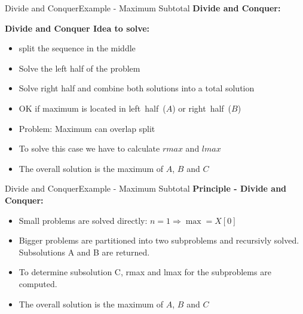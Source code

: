 \begin{frame}{Divide and Conquer}{Example - Maximum Subtotal}
  \textbf{Divide and Conquer:}
  \vspace{-1.5em}
  \begin{figure}
    \begin{adjustbox}{width=\linewidth}
      
    \end{adjustbox}
    \label{fig:divide_and_conquer:max_sub_total_divide}
  \end{figure}
   \vspace{-1.5em}
\textbf{Divide and Conquer Idea to solve:}
  \begin{itemize}
  \item split the sequence in the middle 
  \item<2->
    Solve the left half of the problem
  \item<3->
    Solve right half and combine both solutions into a total solution
  \item<4->
    OK if maximum is located in {\color{Mittel-Blau}left~half~($A$)}
    or {\color{Mittel-Blau}right~half~($B$)}
  \item<5->
    Problem: Maximum can {\color{Mittel-Blau} overlap split }
  \item<6->
    To solve this case we have to calculate $rmax$ and $lmax$
  \item<7->
    The overall solution is the {\color{Mittel-Blau}maximum of $A$, $B$ and $C$}
  \end{itemize}
\end{frame}


\begin{frame}{Divide and Conquer}{Example - Maximum Subtotal}
  \textbf{Principle - Divide and Conquer:}
  \begin{itemize}
    \item<2->
      Small problems are solved directly: {\color{Mittel-Blau}$n = 1 \Rightarrow \max = X[0]$}
    \item<3->
      Bigger problems are partitioned into two subproblems and recursivly solved. Subsolutions A and B
      are returned.
    \item<4>
      To determine subsolution C, rmax and lmax for the subproblems are computed.
    \item<5>
      The overall solution is the {\color{Mittel-Blau}maximum of $A$, $B$ and $C$}
  \end{itemize}
\end{frame}

